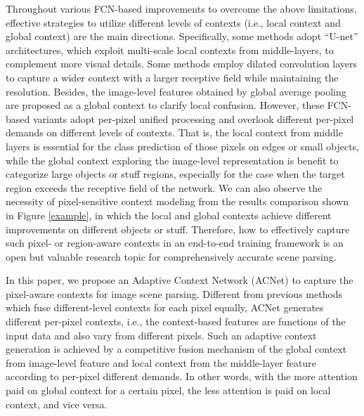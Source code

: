 \documentclass[10pt,twocolumn,letterpaper]{article}
\begin{document}
Throughout various FCN-based improvements to overcome the above limitations, effective strategies to utilize different levels of contexts (i.e., local context and global context) are the main directions. Specifically, some methods \cite{refinenet,exfuse, yu2018learning,fu2017stacked} adopt ``U-net'' architectures, which exploit multi-scale local contexts from middle-layers, to complement more visual details. Some methods \cite{deeplabv2,yu2015multi} employ dilated convolution layers to capture a wider context with a larger receptive field while maintaining the resolution. Besides, the image-level features obtained by global average pooling \cite{parsenet,deeplabv3,pspnet} are proposed  as a global context to clarify local confusion. However, these FCN-based variants adopt per-pixel unified processing and overlook different per-pixel demands on different levels of contexts.  
That is, the local context from middle layers is essential for the class prediction of those pixels on edges or small objects, while the global context exploring the image-level representation is benefit to categorize large objects or stuff regions, especially for the case when the target region exceeds the receptive field of the network.
We can also observe the necessity of pixel-sensitive context modeling from the results comparison shown in Figure \ref{example}, in which the local and global contexts achieve different improvements on different objects or stuff. 
Therefore, how to effectively capture such pixel- or region-aware contexts in an end-to-end training framework is an open but valuable research topic for comprehensively accurate scene parsing. 

In this paper, we propose an Adaptive Context Network (ACNet) to capture the pixel-aware contexts for image scene parsing. Different from previous methods which fuse different-level contexts for each pixel equally,
ACNet generates different per-pixel contexts, i.e., the context-based features are functions of the input data and also vary from different pixels. Such an adaptive context generation is achieved by a competitive fusion mechanism of the global context from image-level feature and local context from the middle-layer feature according to per-pixel different demands. In other words, with the more attention paid on global context for a certain pixel, the less attention is paid on local context, and vice versa. 
\end{document}
